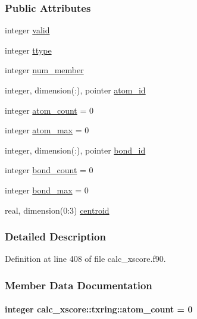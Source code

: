 \subsubsection*{Public Attributes}
\begin{DoxyCompactItemize}
\item 
integer \hyperlink{structcalc__xscore_1_1txring_a01f6d01b46aa0beb306b48cfafe51bcf}{valid}
\item 
integer \hyperlink{structcalc__xscore_1_1txring_a97bbaae70912399e1cd84b75afd2304e}{ttype}
\item 
integer \hyperlink{structcalc__xscore_1_1txring_ad4f6fb0318b14ad9a6022d8e83a968fe}{num\-\_\-member}
\item 
integer, dimension(\-:), pointer \hyperlink{structcalc__xscore_1_1txring_ab5983392042485d218c47052ccf46ec4}{atom\-\_\-id}
\item 
integer \hyperlink{structcalc__xscore_1_1txring_a30ef29dc2d8bbcea02c2caa517427e80}{atom\-\_\-count} = 0
\item 
integer \hyperlink{structcalc__xscore_1_1txring_a133ec60650d0977a33ffb81439f162bd}{atom\-\_\-max} = 0
\item 
integer, dimension(\-:), pointer \hyperlink{structcalc__xscore_1_1txring_abcca741ddceed03c2de24ee66c0c74ce}{bond\-\_\-id}
\item 
integer \hyperlink{structcalc__xscore_1_1txring_afc8a746aa23622b07a538950ed48746a}{bond\-\_\-count} = 0
\item 
integer \hyperlink{structcalc__xscore_1_1txring_a3d97d2a271705d15ed99852f1207b4cd}{bond\-\_\-max} = 0
\item 
real, dimension(0\-:3) \hyperlink{structcalc__xscore_1_1txring_a9fe147d85980c98b2739dbd3530a7df8}{centroid}
\end{DoxyCompactItemize}


\subsubsection{Detailed Description}


Definition at line 408 of file calc\-\_\-xscore.\-f90.



\subsubsection{Member Data Documentation}
\hypertarget{structcalc__xscore_1_1txring_a30ef29dc2d8bbcea02c2caa517427e80}{
\paragraph[{atom\-\_\-count}]{\setlength{\rightskip}{0pt plus 5cm}integer calc\-\_\-xscore\-::txring\-::atom\-\_\-count = 0}}\label{structcalc__xscore_1_1txring_a30ef29dc2d8bbcea02c2caa517427e80}


